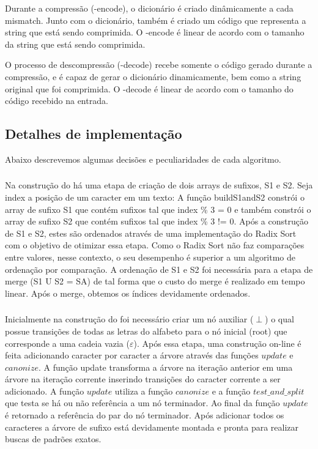 Durante a compressão (\lz-encode), o dicionário é criado dinâmicamente a cada
mismatch. Junto com o dicionário, também é criado um código que representa a
string que está sendo comprimida. O \lz-encode é linear de acordo
com o tamanho da string que está sendo comprimida.

O processo de descompressão (\lz-decode) recebe somente o código gerado durante
a compressão, e é capaz de gerar o dicionário dinamicamente, bem como a string
original que foi comprimida. O \lz-decode é linear de acordo com o tamanho do
código recebido na entrada.


\subsection{Detalhes de implementação}
Abaixo descrevemos algumas decisões e peculiaridades de cada algoritmo.

\subsubsection{\lsa}

Na construção do \lsa há uma etapa de criação de dois arrays de sufixos, S1 e S2.
Seja index a posição de um caracter em um texto:  A função buildS1andS2 constrói
o array de sufixo S1 que contém sufixos tal que index \% 3 = 0 e também constrói
o array de sufixo S2 que contém sufixos tal que index \% 3 != 0. Após a
construção de S1 e S2, estes são ordenados através de uma implementação do Radix
Sort com o objetivo de otimizar essa etapa. Como o Radix Sort não faz
comparações entre valores, nesse contexto, o seu desempenho é superior a um
algoritmo de ordenação por comparação. A ordenação de S1 e S2 foi necessária
para a etapa de merge (S1  U  S2 = SA)  de tal forma que o custo do merge é
realizado em tempo linear. Após o merge, obtemos os índices devidamente
ordenados.

\subsubsection{\lst}
Inicialmente na construção do \lst foi necessário criar um nó auxiliar ($\perp$) o qual possue transições de todas as letras do alfabeto para o nó inicial (root) que corresponde a uma cadeia vazia ($\varepsilon$). Após essa etapa, uma construção on-line é feita adicionando caracter por caracter a árvore através das funções $update$ e $canonize$. A função update transforma a árvore na iteração anterior em uma árvore na iteração corrente inserindo transições do caracter corrente a ser adicionado. A função $update$ utiliza a função $canonize$ e a função $test{\_}and{\_}split$ que testa se há ou não referência a um nó terminador. Ao final da função $update$ é retornado a referência do par do nó terminador. Após adicionar todos os caracteres a árvore de sufixo está devidamente montada e pronta para realizar buscas de padrões exatos.


